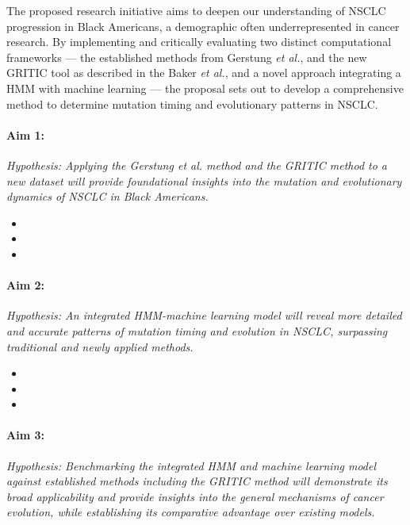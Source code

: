 The proposed research initiative aims to deepen our understanding of NSCLC progression in Black Americans, 
a demographic often underrepresented in cancer research. 
By implementing and critically evaluating two distinct computational frameworks — 
the established methods from Gerstung \textit{et al.}, and the new GRITIC tool as described in the Baker \textit{et al.}, 
and a novel approach integrating a HMM with machine learning — 
the proposal sets out to develop a comprehensive method to determine mutation timing and evolutionary patterns in NSCLC.

\paragraph*{Aim 1: \SpecificAimOne} 
\emph{Hypothesis: Applying the Gerstung \textit{et al.} method and the GRITIC method to a new dataset will provide foundational insights into the mutation and evolutionary dynamics of NSCLC in Black Americans.}

\begin{itemize}[noitemsep]
    \item \SpecificAimOneA
    \item \SpecificAimOneB
    \item \SpecificAimOneC
\end{itemize}

\paragraph*{Aim 2: \SpecificAimTwo} 
\emph{Hypothesis: An integrated HMM-machine learning model will reveal more detailed and accurate patterns of mutation timing and evolution in NSCLC, surpassing traditional and newly applied methods.}

\begin{itemize}[noitemsep]
    \item \SpecificAimTwoA
    \item \SpecificAimTwoB
    \item \SpecificAimTwoC
\end{itemize}

\paragraph*{Aim 3: \SpecificAimThree} 
\emph{Hypothesis: Benchmarking the integrated HMM and machine learning model against established methods including the GRITIC method will demonstrate its broad applicability and provide insights into the general mechanisms of cancer evolution, while establishing its comparative advantage over existing models.}

